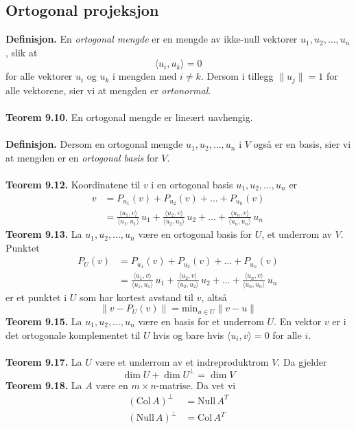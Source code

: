 \documentclass{article}
\begin{document}
\subsection{Ortogonal projeksjon}
\textbf{Definisjon.} En \textit{ortogonal mengde} er en mengde av ikke-null vektorer $u_1, u_2, \dots, u_n$, slik at
\[ \langle u_i, u_k \rangle = 0 \]
for alle vektorer $u_i$ og $u_k$ i mengden med $i \neq k$. Dersom i tillegg $\lVert u_j \rVert = 1$ for alle vektorene, sier vi at mengden er \textit{ortonormal}.
\\\\
\textbf{Teorem 9.10.} En ortogonal mengde er lineært uavhengig.
\\\\
\textbf{Definisjon.} Dersom en ortogonal mengde $u_1, u_2, \dots, u_n$ i $V$ også er en basis, sier vi at mengden er en \textit{ortogonal basis} for $V$.
\\\\
\textbf{Teorem 9.12.} Koordinatene til $v$ i en ortogonal basis $u_1, u_2, \dots, u_n$ er
\begin{align*}
    v &= P_{u_1}(v) + P_{u_2}(v) + \dots + P_{u_n}(v) \\
    &= \frac{\langle u_1, v \rangle}{\langle u_1, u_1 \rangle}\,u_1
    + \frac{\langle u_2, v \rangle}{\langle u_2, u_2 \rangle}\,u_2
    + \dots + \frac{\langle u_n, v \rangle}{\langle u_n, u_n \rangle}\,u_n
\end{align*}
\textbf{Teorem 9.13.} La $u_1, u_2, \dots, u_n$ være en ortogonal basis for $U$, et underrom av $V$. Punktet
\begin{align*}
    P_U(v) &= P_{u_1}(v) + P_{u_2}(v) + \dots + P_{u_n}(v) \\
    &= \frac{\langle u_1, v \rangle}{\langle u_1, u_1 \rangle}\,u_1
    + \frac{\langle u_2, v \rangle}{\langle u_2, u_2 \rangle}\,u_2
    + \dots + \frac{\langle u_n, v \rangle}{\langle u_n, u_n \rangle}\,u_n
\end{align*}
er et punktet i $U$ som har kortest avstand til $v$, altså
\[ \lVert v - P_U(v) \rVert = \text{min}_{u \in U} \lVert v - u \rVert \]
\textbf{Teorem 9.15.} La $u_1, u_2, \dots, u_n$ være en basis for et underrom $U$. En vektor $v$ er i det ortogonale komplementet til $U$ hvis og bare hvis $\langle u_i, v \rangle = 0$ for alle $i$.
\\\\
\textbf{Teorem 9.17.} La $U$ være et underrom av et indreproduktrom $V$. Da gjelder
\[ \dim{U} + \dim{U^\perp} = \dim{V} \]
\textbf{Teorem 9.18.} La $A$ være en $m \times n$-matrise. Da vet vi
\begin{align*}
    (\text{Col}\,A)^\perp &= \text{Null}\,A^T \\
    (\text{Null}\,A)^\perp &= \text{Col}\,A^T
\end{align*}
\end{document}
